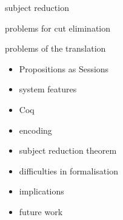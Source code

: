 \documentclass{beamer}
\begin{document}
\begin{frame}
subject reduction
\end{frame}

\begin{comment}
subject reduction is formalised using a relation on processes
\end{comment}

\begin{frame}
problems for cut elimination
\end{frame}

\begin{comment}
sessions correspond to propositions
processes correspond to proofs
cut elimination corresponds to communication

cut elimination is not currently proven since we require a termination measure
on the length of a derivation and a relationship between the subprocesses of a
cut. other work based on formalising logics where the derivations are explicit
may be inspirational
\end{comment}

\begin{frame}
problems of the translation
\end{frame}

\begin{comment}
the translation seems to require a duplication of the specifications for cp
and gv typing rules not done

what can we show them for the failures?

here are some issues and things learnt! -- our guidelines are all about
modularisation, representation, library reuse, automation!
\end{comment}

\begin{frame}
\begin{itemize}
\item Propositions as Sessions
\item system features
\item Coq
\item encoding
\item subject reduction theorem
\item difficulties in formalisation
\item implications
\item future work
\end{itemize}
\end{frame}

\printbibliography
\end{document}
